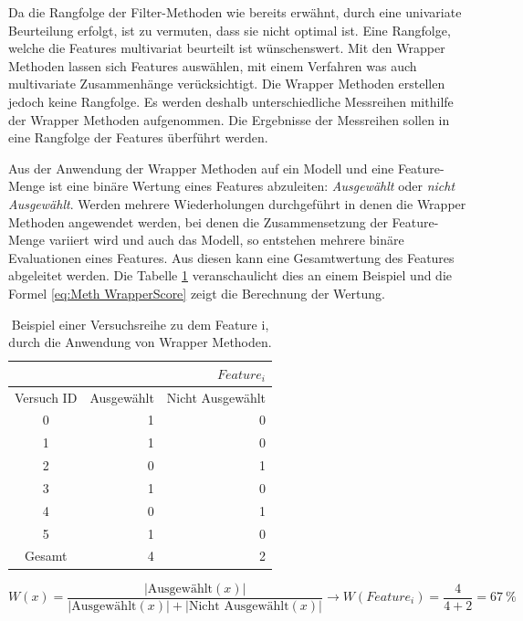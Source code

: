 Da die Rangfolge der Filter-Methoden wie bereits erwähnt, durch eine univariate Beurteilung erfolgt, ist zu vermuten, dass sie nicht optimal ist. Eine Rangfolge, welche die Features multivariat beurteilt ist wünschenswert. Mit den Wrapper Methoden lassen sich Features auswählen, mit einem Verfahren was auch multivariate Zusammenhänge verücksichtigt. Die Wrapper Methoden erstellen jedoch keine Rangfolge. Es werden deshalb unterschiedliche Messreihen mithilfe der Wrapper Methoden aufgenommen. Die Ergebnisse der Messreihen sollen in eine Rangfolge der Features überführt werden.\par

Aus der Anwendung der Wrapper Methoden auf ein Modell und eine Feature-Menge ist eine binäre Wertung eines Features abzuleiten: \textit{Ausgewählt} oder \textit{nicht Ausgewählt}. Werden mehrere Wiederholungen durchgeführt in denen die Wrapper Methoden angewendet werden, bei denen die Zusammensetzung der Feature-Menge variiert wird und auch das Modell, so entstehen mehrere binäre Evaluationen eines Features. Aus diesen kann eine Gesamtwertung des Features abgeleitet werden. Die Tabelle \ref{tab:bspWrapScore} veranschaulicht dies an einem Beispiel und die Formel \ref{eq:Meth WrapperScore} zeigt die Berechnung der Wertung.

\begin{table}[htb]
    \centering
    \caption{Beispiel einer Versuchsreihe zu dem Feature i, durch die Anwendung von Wrapper Methoden.}
    \begin{tabular}{|c|r|r|}
        \hline
        \multicolumn{3}{|r|}{\(Feature_i\)} \\
        \hline
        Versuch ID & Ausgewählt & Nicht Ausgewählt \\
        \hline
        0 & 1 & 0 \\
        1 & 1 & 0 \\
        2 & 0 & 1 \\
        3 & 1 & 0 \\
        4 & 0 & 1 \\
        5 & 1 & 0 \\
        \hline
        \hline
        Gesamt & 4 & 2 \\
        \hline
    \end{tabular}
    \label{tab:bspWrapScore}
\end{table}

\begin{equation}
W(x) = \frac{|\text{Ausgewählt}(x)|}{|\text{Ausgewählt}(x)| + |\text{Nicht Ausgewählt}(x)|} \rightarrow W(Feature_i)=\frac{4}{4+2} = 67\ \%
\label{eq:Meth WrapperScore}
\end{equation}

